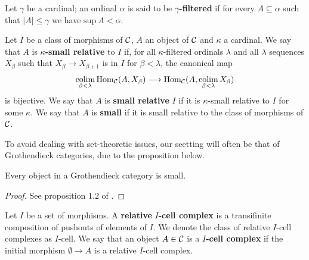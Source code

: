 \begin{definition}
	Let $\gamma$ be a cardinal; an ordinal $\alpha$ is said to be $\gamma$\textbf{-filtered} if for every $A\subseteq \alpha$ such that $|A| \leq \gamma$ we have $\text{sup} \: A < \alpha$.
\end{definition}

\begin{definition}
	Let $I$ be a class of morphisms of $\mathcal{C}$, $A$ an object of $\mathcal{C}$ and $\kappa$ a cardinal. We say that $A$ is $\kappa$\textbf{-small relative} to $I$ if, for all $\kappa$-filtered ordinals $\lambda$ and all $\lambda$ sequences $X_\beta$ such that $X_\beta \longrightarrow X_{\beta+1}$ is in $I$ for $\beta < \lambda$, the canonical map 
	\[\colim_{\beta< \lambda} \Hom_\C(A, X_\beta) \longrightarrow \Hom_{\C}(A, \colim_{\beta < \lambda} X_\beta)\]
	is bijective. We say that $A$ is \textbf{small relative} $I$ if it is $\kappa$-small relative to $I$ for some $\kappa$. We say that $A$ is \textbf{small} if it is small relative to the class of morphisms of $\mathcal{C}$.
\end{definition}




To avoid dealing with set-theoretic issues, our seetting will often be that of Grothendieck categories, due to the proposition below.

\begin{proposition}
	Every object in a Grothendieck category is small.
\end{proposition}
\begin{proof}
	See proposition 1.2 of \cite{HoveySheaves1999}.
\end{proof}

\begin{definition}
	Let $I$ be a set of morphisms. A \textbf{relative} $I$\textbf{-cell complex} is a transifinite composition of pushouts of elements of $I$. We denote the class of relative $I$-cell complexes as $I$-cell. We say that an object $A\in \mathcal{C}$ is a $I$\textbf{-cell complex} if the initial morphism $\emptyset \longrightarrow A$ is a relative $I$-cell complex.
\end{definition}

